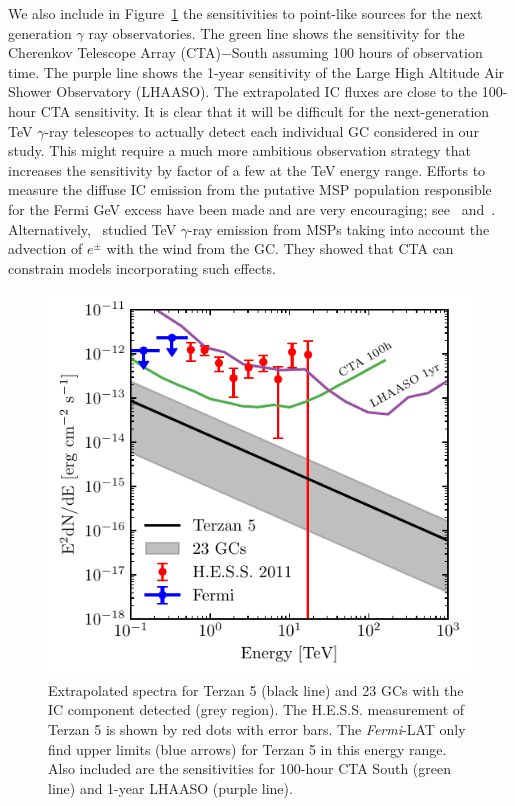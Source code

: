 \documentclass[doublespace,nopageskip]{VTthesis} %
\begin{document}
We also include in Figure~\ref{fig:TeV} the sensitivities to point-like sources for the next generation $\gamma$ ray observatories. The green line shows the sensitivity for the Cherenkov Telescope Array (CTA)$-$South assuming 100 hours of observation time. The purple line shows the 1-year sensitivity of the Large High Altitude Air Shower Observatory (LHAASO). The extrapolated IC fluxes are close to the 100-hour CTA sensitivity. It is clear that it will be difficult for the next-generation TeV $\gamma$-ray telescopes to actually detect each individual GC considered in our study. This might require a much more ambitious observation strategy that increases the sensitivity by factor of a few at the TeV energy range.  Efforts to measure the diffuse IC emission from the putative MSP population responsible for the Fermi GeV excess have been made and are very encouraging; see~\citet{2019PhRvD..99l3020S} and~\citet{2021arXiv210205648M}. Alternatively,~\citet{2016MNRAS.458.1083B} studied TeV $\gamma$-ray emission from MSPs taking into account the advection of $e^\pm$ with the wind from the GC. They showed that CTA can constrain models incorporating such effects. 

\begin{figure}
    \centering
    \includegraphics{Figures/Globular/TeV.pdf}
    \caption{Extrapolated spectra for Terzan 5 (black line) and 23 GCs with the IC component detected (grey region). The H.E.S.S. measurement of Terzan 5 is shown by red dots with error bars. The {\it Fermi}-LAT only find upper limits (blue arrows) for Terzan 5 in this energy range. Also included are the sensitivities for 100-hour CTA South (green line) and 1-year LHAASO (purple line).}
    \label{fig:TeV}
\end{figure}
\end{document}
